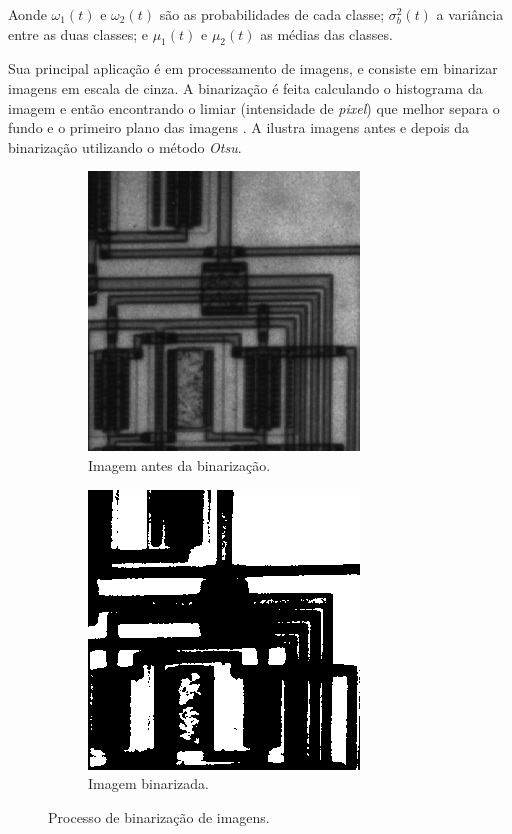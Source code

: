 \par Aonde $\omega_{1}(t)$ e $\omega_{2}(t)$ são as probabilidades de cada classe; $\sigma_{b}^{2}(t)$ a variância entre as duas classes; e $\mu_{1}(t)$ e $\mu_{2}(t)$ as médias das classes.

\par Sua principal aplicação é em processamento de imagens, e consiste em binarizar imagens em escala de cinza. A binarização é feita calculando o histograma da imagem e então encontrando o limiar (intensidade de \textit{pixel}) que melhor separa o fundo e o primeiro plano das imagens \cite{gonsalez2006}. A  ilustra imagens antes e depois da binarização utilizando o método \textit{Otsu}.

\begin{figure}[h!]
\centering
\begin{subfigure}{.5\textwidth}
  \centering
  \includegraphics[width=.5\linewidth]{img/stdfilt_entrada.png}
  \caption{Imagem antes da binarização.}
\end{subfigure}%
\begin{subfigure}{.5\textwidth}
  \centering
  \includegraphics[width=.5\linewidth]{img/otsu_binaria.png}
  \caption{Imagem binarizada.}
\end{subfigure}
\caption{Processo de binarização de imagens.}
\label{fig:otsu}
\end{figure}

